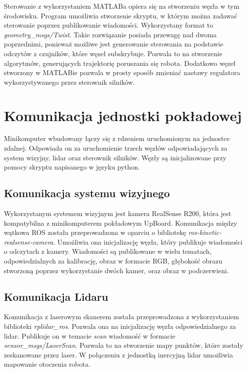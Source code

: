 Sterowanie z wykorzystaniem MATLABa opiera się na stworzeniu węzła w tym środowisku. Program umożliwia stworzenie skryptu, w którym można zadawać sterowanie poprzez publikowanie wiadomości. Wykorzystany format to \textit{geometry\_msgs/Twist}. Takie rozwiązanie posiada przewagę nad dwoma poprzednimi, ponieważ możliwe jest generowanie sterowania na podstawie odczytów z czujników, które węzeł subskrybuje. Pozwala to na stworzenie algorytmów, generujących trajektorię poruszania się robota. Dodatkowo węzeł stworzony w MATLABie pozwala w prosty sposób zmieniać nastawy regulatora wykorzystywanego przez sterownik silników.

\section{Komunikacja jednostki pokładowej}

Minikomputer wbudowany łączy się z rdzeniem uruchomionym na jednostce zdalnej. Odpowiada on za uruchomienie trzech węzłów odpowiadających za system wizyjny, lidar oraz sterownik silników. Węzły są inicjalizowane przy pomocy skryptu napisanego w języku python. 

\subsection{Komunikacja systemu wizyjnego}

Wykorzystanym systemem wizyjnym jest kamera RealSense R200, która jest kompatybilna z minikomputerem pokładowym UpBoard. Komunikacja między wątkowa ROS została przeprowadzona w oparciu o bibliotekę \textit{ros-kinetic-realsense-camera}. Umożliwia ona inicjalizację węzła, który publikuje wiadomości o odczytach z kamery. Wiadomości są publikowane w wielu tematach, odpowiedzialnych za kalibrację, obraz w formacie RGB, głębokość obrazu stworzoną poprzez wykorzystanie dwóch kamer, oraz obraz w podczerwieni. 

\subsection{Komunikacja Lidaru}

Komunikacja z laserowym skanerem została przeprowadzona z wykorzystaniem biblioteki \textit{rplidar\_ros}. Pozwala ona na inicjalizację węzła odpowiedzialnego za lidar. Publikuje on w temacie \textit{scan} wiadomość w formacie 
\textit{sensor\_msgs/LaserScan}. Pozwala to na stworzenie mapy punktów, które zostały zeskanowane przez laser. W połączeniu z jednostką inercyjną lidar umożliwia mapowanie otoczenia robota. 


